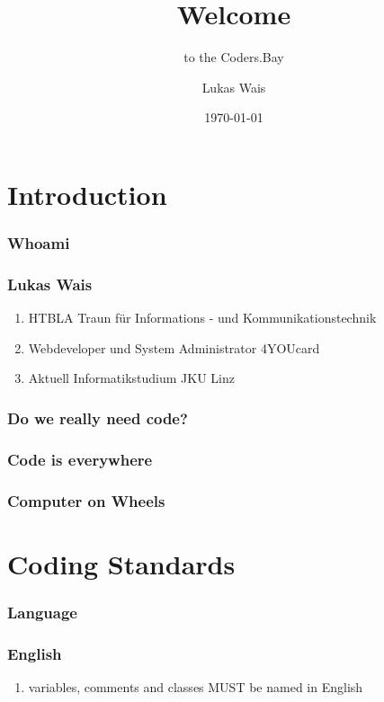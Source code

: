 \documentclass{beamer}
\title{Welcome}
\subtitle{to the Coders.Bay}
\author{Lukas Wais}
\date{\today}
\begin{document}
\frame{\titlepage}
\frame{\tableofcontents}
\section{Introduction}
\subsubsection{Whoami}
\begin{frame}
  \frametitle{Lukas Wais}
  \begin{enumerate}
    \item HTBLA Traun für Informations - und Kommunikationstechnik
    \item Webdeveloper und System Administrator 4YOUcard
    \item Aktuell Informatikstudium JKU Linz
  \end{enumerate}
\end{frame}

\subsubsection{Do we really need code?}
\begin{frame}
  \frametitle{Code is everywhere}
\end{frame}

\begin{frame}
  \frametitle{Computer on Wheels}
\end{frame}

\section{Coding Standards}
\subsubsection{Language}
\begin{frame}
  \frametitle{English}

  \begin{enumerate}
    \item variables, comments and classes MUST be named in English
  \end{enumerate}
\end{frame}
\end{document}
